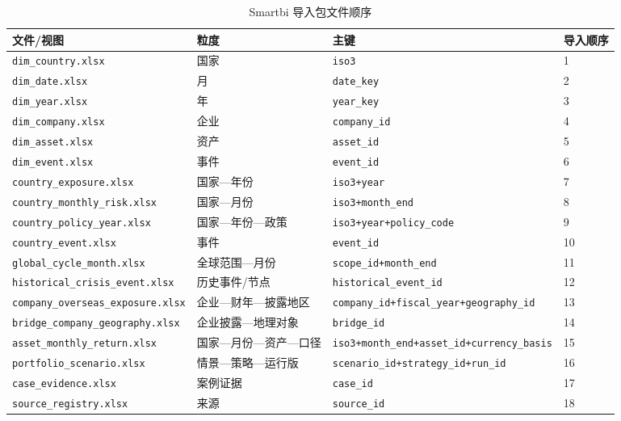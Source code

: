 \documentclass[UTF8,fontset=windows,12pt,openany]{ctexbook}
\newcommand{\Field}[1]{{\small\nolinkurl{#1}}}
\begin{document}
\begin{longtable}{p{4.2cm}p{3.3cm}p{3.2cm}p{2.6cm}}
\caption{Smartbi 导入包文件顺序}\label{tab:import-package}\\
\toprule
\textbf{文件/视图} & \textbf{粒度} & \textbf{主键} & \textbf{导入顺序}\\
\midrule
\Field{dim_country.xlsx} & 国家 & \Field{iso3} & 1\\
\Field{dim_date.xlsx} & 月 & \Field{date_key} & 2\\
\Field{dim_year.xlsx} & 年 & \Field{year_key} & 3\\
\Field{dim_company.xlsx} & 企业 & \Field{company_id} & 4\\
\Field{dim_asset.xlsx} & 资产 & \Field{asset_id} & 5\\
\Field{dim_event.xlsx} & 事件 & \Field{event_id} & 6\\
\Field{country_exposure.xlsx} & 国家—年份 & \Field{iso3+year} & 7\\
\Field{country_monthly_risk.xlsx} & 国家—月份 & \Field{iso3+month_end} & 8\\
\Field{country_policy_year.xlsx} & 国家—年份—政策 & \Field{iso3+year+policy_code} & 9\\
\Field{country_event.xlsx} & 事件 & \Field{event_id} & 10\\
\Field{global_cycle_month.xlsx} & 全球范围—月份 & \Field{scope_id+month_end} & 11\\
\Field{historical_crisis_event.xlsx} & 历史事件/节点 & \Field{historical_event_id} & 12\\
\Field{company_overseas_exposure.xlsx} & 企业—财年—披露地区 & \Field{company_id+fiscal_year+geography_id} & 13\\
\Field{bridge_company_geography.xlsx} & 企业披露—地理对象 & \Field{bridge_id} & 14\\
\Field{asset_monthly_return.xlsx} & 国家—月份—资产—口径 & \Field{iso3+month_end+asset_id+currency_basis} & 15\\
\Field{portfolio_scenario.xlsx} & 情景—策略—运行版 & \Field{scenario_id+strategy_id+run_id} & 16\\
\Field{case_evidence.xlsx} & 案例证据 & \Field{case_id} & 17\\
\Field{source_registry.xlsx} & 来源 & \Field{source_id} & 18\\
\bottomrule
\end{longtable}

\newpage
\end{document}
